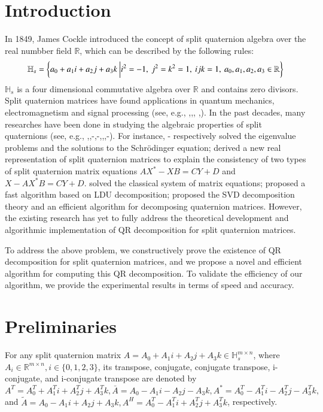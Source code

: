\documentclass[1p]{elsarticle}
\numberwithin{equation}{section}
\begin{document}

\section{Introduction}
In 1849, James Cockle \cite{Cockle1849} introduced the concept of split quaternion algebra over the real numbber field $\mathbb{R}$,   which can be described by the following rules:
\begin{equation*}
    \small
    \mathbb{H}_s = \left\{ a_0 + a_1 i + a_2 j + a_3 k \ \bigg| i^2 = -1,\ j^2 = k^2 = 1, \ ijk = 1, \ a_0, a_1, a_2, a_3 \in \mathbb{R} \right\} 
\end{equation*} 
$\mathbb{H}_s$ is a four dimensional commutative algebra over $\mathbb{R}$ and contains zero divisors. 
Split quaternion matrices have found applications in quantum mechanics, electromagnetism and signal processing (see, e.g., \cite{Gog2022},\cite{Hasebe2010},\cite{Le2022},
\cite{Z2022},\cite{Wang2023}). In the past decades, many researches  have been done in studying the algebraic properties of split quaternions (see, e.g., \cite{Abłamowicz2020},\cite{Yasemin2012},\cite{TJiang2015}-\cite{TJiang2018},\cite{Zhuo2020}-\cite{Xin2019},\cite{mma},\cite{wang},\cite{Wang2021}-\cite{Zhang2015}). For instance, \cite{Jiang2018}-\cite{TJiang2018} respectively solved the eigenvalue problems and the solutions to the Schrödinger equation; \cite{Xin2019} derived a new real representation of split quaternion matrices to explain the consistency of two types of split quaternion matrix equations \(AX^* - XB = CY + D\) and \(X - AX^*B = CY + D\).\cite{wang} solved the classical system of matrix equations; \cite{Wang2021} proposed a fast algorithm based on LDU decomposition; \cite{Gang2024}  proposed the SVD decomposition theory and an efficient algorithm for decomposing quaternion matrices. However, the existing research has yet to fully address the theoretical development and algorithmic implementation of QR decomposition for split quaternion matrices.

To address the above problem, we constructively prove the existence of QR decomposition for split quaternion matrices, and we propose a novel and efficient algorithm for computing this QR decomposition.  To validate the efficiency  of our algorithm, we provide the experimental results in terms of speed and accuracy.

\section{Preliminaries}
For any split quaternion matrix ${A}=A_{0}+A_{1}i + A_{2}j + A_{3}k \in\mathbb{H}_{s}^{m\times n}$, where $A_{i}\in\mathbb{R}^{m\times n}, i\in\{0,1,2,3\}$, its transpose, conjugate, conjugate transpose, i-conjugate, and i-conjugate transpose are  denoted by 
 ${A}^T = A_0^T + A_1^Ti + A_2^Tj + A_3^Tk,\bar{{A}} = A_0 - A_1i - A_2j - A_3k, {A}^* = A_0^T - A_1^Ti - A_2^Tj - A_3^Tk,$ and $\tilde{{A}} = A_0 - A_1i + A_2j + A_3k,{A}^H = A_0^T - A_1^Ti + A_2^Tj + A_3^Tk$, respectively.
\end{document}
